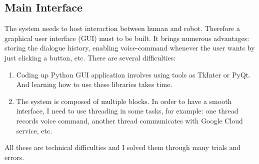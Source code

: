 \subsection{Main Interface}
The system needs to host interaction between human and robot. Therefore a graphical user interface (GUI) must to be built. It brings numerous advantages: storing the dialogue history, enabling voice-command whenever the user wants by just clicking a button, etc. There are several difficulties:
\begin{enumerate}
	\item Coding up Python GUI application involves using tools as TkInter or PyQt. And learning how to use these libraries takes time.
	\item The system is composed of multiple blocks. In order to have a smooth interface, I need to use threading in some tasks, for example: one thread records voice command, another thread communicates with Google Cloud service, etc. 
\end{enumerate}
All these are technical difficulties and I solved them through many trials and errors.